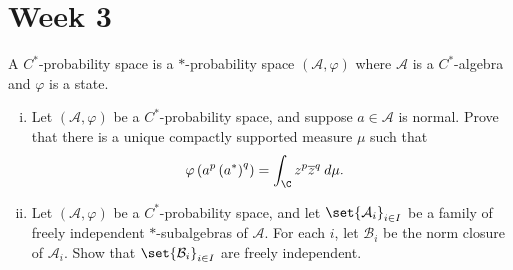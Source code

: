 \documentclass[10pt]{mypackage}
\begin{document}
\section{Week 3}%
\begin{problem}[Exercise 4.12]
  A $C^{\ast}$-probability space is a $\ast$-probability space $\left( \mathcal{A},\varphi \right)$ where $\mathcal{A}$ is a $C^{\ast}$-algebra and $\varphi$ is a state.
  \begin{enumerate}[(i)]
    \item Let $\left( \mathcal{A},\varphi \right)$ be a $C^{\ast}$-probability space, and suppose $a\in \mathcal{A}$ is normal. Prove that there is a unique compactly supported measure $\mu$ such that
      \begin{align*}
        \varphi\left( a^{p}\left( a^{\ast} \right)^{q} \right) &= \int_{\C}^{} z^{p} \overline{z}^{q}\:d\mu.
      \end{align*}
    \item Let $\left( \mathcal{A},\varphi \right)$ be a $C^{\ast}$-probability space, and let $\set{\mathcal{A}_i}_{i\in I}$ be a family of freely independent $\ast$-subalgebras of $\mathcal{A}$. For each $i$, let $\mathcal{B}_i$ be the norm closure of $\mathcal{A}_i$. Show that $\set{\mathcal{B}_i}_{i\in I}$ are freely independent.
  \end{enumerate}
\end{problem}
\end{document}
